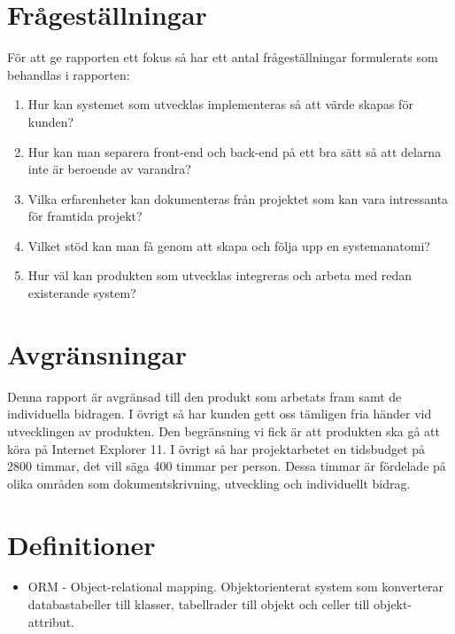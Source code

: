 \section{Frågeställningar}
För att ge rapporten ett fokus så har ett antal frågeställningar formulerats som behandlas i rapporten:
\begin{enumerate}
	\item Hur kan systemet som utvecklas implementeras så att värde skapas för kunden?
	\item Hur kan man separera front-end och back-end på ett bra sätt så att delarna inte är beroende av varandra?
	\item Vilka erfarenheter kan dokumenteras från projektet som kan vara intressanta för framtida projekt?
	\item Vilket stöd kan man få genom att skapa och följa upp en systemanatomi?
	\item Hur väl kan produkten som utvecklas integreras och arbeta med redan existerande system?
\end{enumerate}

\section{Avgränsningar}
Denna rapport är avgränsad till den produkt som arbetats fram samt de individuella bidragen. I övrigt så har kunden gett oss tämligen fria händer vid utvecklingen av produkten. Den begränsning vi fick är att produkten ska gå att köra på Internet Explorer 11.
I övrigt så har projektarbetet en tidsbudget på 2800 timmar, det vill säga 400 timmar per person. Dessa timmar är fördelade på olika områden som dokumentskrivning, utveckling och individuellt bidrag.

\section{Definitioner}

\begin{itemize}

\item ORM - Object-relational mapping. Objektorienterat system som konverterar databastabeller till klasser, tabellrader till objekt och celler till objekt-attribut.

\end{itemize}

\newpage
